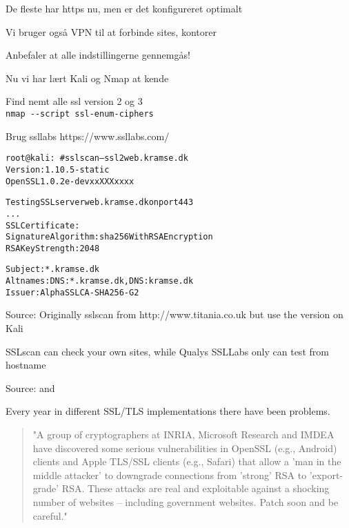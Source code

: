 \documentclass[Screen16to9,17pt]{foils}
\begin{document}
\begin{list2}
\item De fleste har https nu, men er det konfigureret optimalt
\item Vi bruger også VPN til at forbinde sites, kontorer
\item Anbefaler at alle indstillingerne gennemgås!
\end{list2}



\begin{list1}
\item Nu vi har lært Kali og Nmap at kende
\begin{list2}
\item Find nemt alle ssl version 2 og 3\\
\verb+nmap --script ssl-enum-ciphers+
\item Brug ssllabs https://www.ssllabs.com/
\end{list2}
\end{list1}



\begin{alltt}\small
root@kali:~# sslscan --ssl2 web.kramse.dk
Version: 1.10.5-static
OpenSSL 1.0.2e-dev xx XXX xxxx

Testing SSL server web.kramse.dk on port 443
...
  SSL Certificate:
Signature Algorithm: sha256WithRSAEncryption
RSA Key Strength:    2048

Subject:  *.kramse.dk
Altnames: DNS:*.kramse.dk, DNS:kramse.dk
Issuer:   AlphaSSL CA - SHA256 - G2
\end{alltt}

Source:
Originally sslscan from http://www.titania.co.uk
 but use the version on Kali

SSLscan can check your own sites, while Qualys SSLLabs only can test from hostname





Source:  and \\

Every year in different SSL/TLS implementations there have been problems.




\begin{quote}\small
"A group of cryptographers at INRIA, Microsoft Research and IMDEA have discovered some serious vulnerabilities in OpenSSL (e.g., Android) clients and Apple TLS/SSL clients (e.g., Safari) that allow a 'man in the middle attacker' to downgrade connections from 'strong' RSA to 'export-grade' RSA. These attacks are real and exploitable against a shocking number of websites -- including government websites. Patch soon and be careful."
\end{quote}
\end{document}
